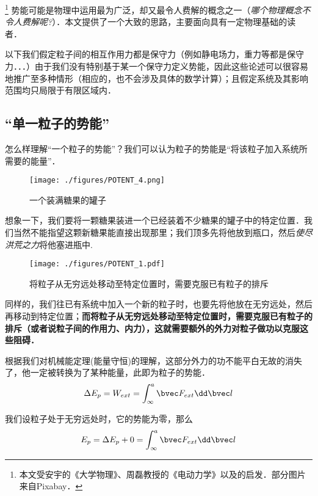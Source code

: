 

\begin{issues}
\issueDraft
\end{issues}

\footnote{本文受安宇的《大学物理》、周磊教授的《电动力学》以及\cite{GriffE}的启发．部分图片来自Pixabay．} 势能可能是物理中运用最为广泛，却又最令人费解的概念之一（\textsl{哪个物理概念不令人费解呢?}）．本文提供了一个大致的思路，主要面向具有一定物理基础的读者．

以下我们假定粒子间的相互作用力都是保守力（例如静电场力，重力等都是保守力．．．）由于我们没有特别基于某一个保守力定义势能，因此这些论述可以很容易地推广至多种情形（相应的，也不会涉及具体的数学计算）；且假定系统及其影响范围均只局限于有限区域内．

\subsection{“单一粒子的势能”}
怎么样理解“一个粒子的势能”？我们可以认为粒子的势能是“将该粒子加入系统所需要的能量”．
\begin{figure}[ht]
\centering
\texttt{[image: ./figures/POTENT\_4.png]}
\caption{一个装满糖果的罐子} \label{POTENT_fig4}
\end{figure}
想象一下，我们要将一颗糖果装进一个已经装着不少糖果的罐子中的特定位置．我们当然不能指望这颗新糖果能直接出现那里；我们顶多先将他放到瓶口，然后\textsl{使尽洪荒之力}将他塞进瓶中.

\begin{figure}[ht]
\centering
\texttt{[image: ./figures/POTENT\_1.pdf]}
\caption{将粒子从无穷远处移动至特定位置时，需要克服已有粒子的排斥} \label{POTENT_fig1}
\end{figure}

同样的，我们往已有系统中加入一个新的粒子时，也要先将他放在无穷远处，然后再移动到特定位置；\textbf{而将粒子从无穷远处移动至特定位置时，需要克服已有粒子的排斥（或者说粒子间的作用力、内力），这就需要额外的外力对粒子做功以克服这些阻碍．}

根据我们对机械能定理(能量守恒)的理解，这部分外力的功不能平白无故的消失了，他一定被转换为了某种能量，此即为粒子的势能．
$$\Delta E_p = W_{ext}=\int^a_\infty \bvec F_{ext} \dd \bvec l $$

我们设粒子处于无穷远处时，它的势能为零，那么
$$E_p = \Delta E_p + 0 = \int^a_\infty \bvec F_{ext} \dd \bvec l$$

